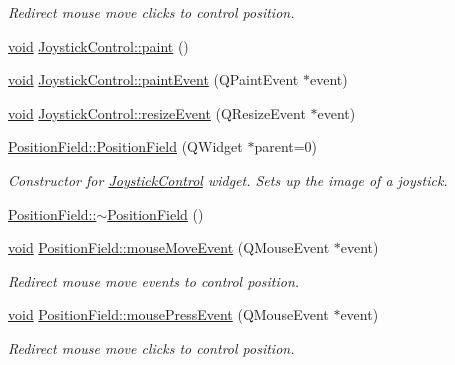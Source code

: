\begin{DoxyCompactItemize}
\begin{DoxyCompactList}\small\item\em \-Redirect mouse move clicks to control position. \end{DoxyCompactList}\item 
\hyperlink{group___u_a_v_objects_plugin_ga444cf2ff3f0ecbe028adce838d373f5c}{void} \hyperlink{group___g_c_s_control_gadget_plugin_gaf79331833d41cf9af3b151a0f18663e0}{\-Joystick\-Control\-::paint} ()
\item 
\hyperlink{group___u_a_v_objects_plugin_ga444cf2ff3f0ecbe028adce838d373f5c}{void} \hyperlink{group___g_c_s_control_gadget_plugin_ga10ed4b7da97f80c638a3eec5a81344c8}{\-Joystick\-Control\-::paint\-Event} (\-Q\-Paint\-Event $\ast$event)
\item 
\hyperlink{group___u_a_v_objects_plugin_ga444cf2ff3f0ecbe028adce838d373f5c}{void} \hyperlink{group___g_c_s_control_gadget_plugin_gaae12f9fa1f0456ecc47b044a2b2db9da}{\-Joystick\-Control\-::resize\-Event} (\-Q\-Resize\-Event $\ast$event)
\item 
\hyperlink{group___g_c_s_control_gadget_plugin_ga41712deeb21d497420f784aacbf72e29}{\-Position\-Field\-::\-Position\-Field} (\-Q\-Widget $\ast$parent=0)
\begin{DoxyCompactList}\small\item\em \-Constructor for \hyperlink{class_joystick_control}{\-Joystick\-Control} widget. \-Sets up the image of a joystick. \end{DoxyCompactList}\item 
\hyperlink{group___g_c_s_control_gadget_plugin_ga4d08deed807894efd521d1f56338650d}{\-Position\-Field\-::$\sim$\-Position\-Field} ()
\item 
\hyperlink{group___u_a_v_objects_plugin_ga444cf2ff3f0ecbe028adce838d373f5c}{void} \hyperlink{group___g_c_s_control_gadget_plugin_gafb1fc61ba09724c992e090e61ea70a77}{\-Position\-Field\-::mouse\-Move\-Event} (\-Q\-Mouse\-Event $\ast$event)
\begin{DoxyCompactList}\small\item\em \-Redirect mouse move events to control position. \end{DoxyCompactList}\item 
\hyperlink{group___u_a_v_objects_plugin_ga444cf2ff3f0ecbe028adce838d373f5c}{void} \hyperlink{group___g_c_s_control_gadget_plugin_ga4e4feaca4c455eaf3f781ac5c02eb0ad}{\-Position\-Field\-::mouse\-Press\-Event} (\-Q\-Mouse\-Event $\ast$event)
\begin{DoxyCompactList}\small\item\em \-Redirect mouse move clicks to control position. \end{DoxyCompactList}\item 

\end{DoxyCompactItemize}
